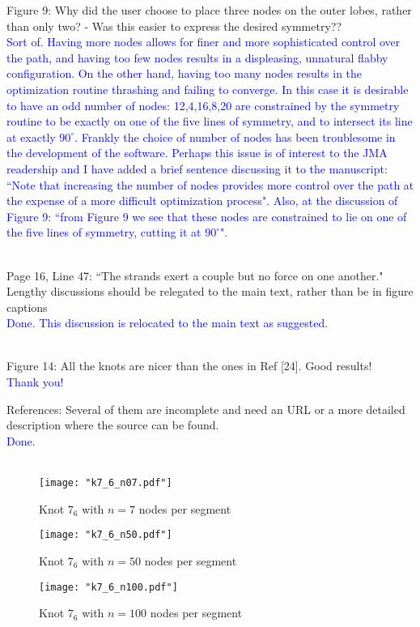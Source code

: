 \documentclass[12pt]{article}
\begin{document}
Figure 9: Why did the user choose to place three nodes on the outer
lobes, rather than only two? - Was this easier to express the desired
symmetry??  \textcolor{blue}{\\Sort of.  Having more nodes allows for
  finer and more sophisticated control over the path, and having too
  few nodes results in a displeasing, unnatural flabby configuration.
  On the other hand, having too many nodes results in the optimization
  routine thrashing and failing to converge.  In this case it is
  desirable to have an odd number of nodes: 12,4,16,8,20 are
  constrained by the symmetry routine to be exactly on one of the five
  lines of symmetry, and to intersect its line at exactly $90^\circ$.
  Frankly the choice of number of nodes has been troublesome in the
  development of the software.  Perhaps this issue is of interest to
  the JMA readership and I have added a brief sentence discussing it
  to the manuscript: ``Note that increasing the number of nodes
  provides more control over the path at the expense of a more
  difficult optimization process".  Also, at the discussion of Figure
  9: ``from Figure 9 we see that these nodes are constrained to lie on
  one of the five lines of symmetry, cutting it at $90^\circ$".\\ \\}

Page 16, Line 47: ``The strands exert a couple but no force on one
another."  Lengthy discussions should be relegated to the main text,
rather than be in figure captions \textcolor{blue}{\\Done.  This
  discussion is relocated to the main text as suggested.\\ \\}


Figure 14: All the knots are nicer than the ones in Ref [24].  Good
results!\textcolor{blue}{\\Thank you!}


References: Several of them are incomplete and need an URL or a more
detailed description where the source can be found.
\textcolor{blue}{\\Done. \\ \\}


\begin{figure}[h]
  \centering
  \texttt{[image: "k7\_6\_n07.pdf"]}
  \caption{Knot \label{7_6_n7} $7_6$ with $n=7$ nodes per segment}
\end{figure}

\begin{figure}[h]
  \centering
  \texttt{[image: "k7\_6\_n50.pdf"]}
  \caption{Knot \label{7_6_n50} $7_6$ with $n=50$ nodes per segment}
\end{figure}

\begin{figure}[h]
  \centering
  \texttt{[image: "k7\_6\_n100.pdf"]}
  \caption{Knot \label{7_6_n100} $7_6$ with $n=100$ nodes per segment}
\end{figure}
\end{document}
